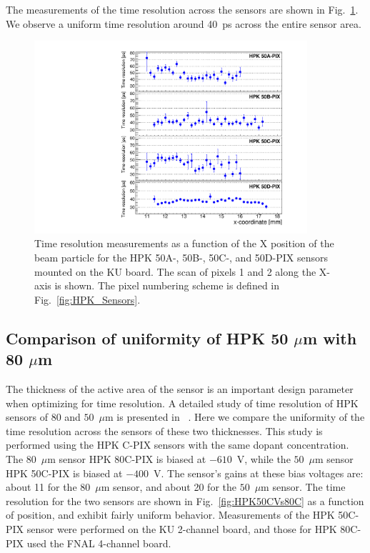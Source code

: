 \documentclass[preprint,1p]{elsarticle}
\begin{document}
The measurements of the time resolution across the sensors are shown in
Fig.~\ref{fig:KUBoard_50ABCD_TimeResolution}. We observe a uniform time
resolution around 40~ps across the entire sensor area. 


\begin{figure}[htbp] 
\centering
\includegraphics[width=0.9\textwidth]{figs/KUBoard_HPK50ABCD/KUBoard_50ABCD_TimeResolution.pdf} 
\caption{Time resolution measurements as a function of the X position of the beam particle
for the HPK 50A-, 50B-, 50C-, and 50D-PIX sensors mounted on the KU board. The scan of 
pixels 1 and 2 along the X-axis is shown. The pixel numbering scheme is 
defined in Fig.~\ref{fig:HPK_Sensors}.} 
\label{fig:KUBoard_50ABCD_TimeResolution} 
\end{figure} 


\subsection{Comparison of uniformity of HPK 50 $\mu$m with 80 $\mu$m}
\label{sec:HPK50vs80}

The thickness of the active area of the sensor is an important design parameter
when optimizing for time resolution. A detailed study of time resolution of HPK
sensors of 80 and $50$~$\mu$m is presented in ~\cite{Galloway:2017gfx}. Here we
compare the uniformity of the time resolution across the sensors of these two
thicknesses. This study is performed using the HPK C-PIX sensors with the same
dopant concentration. The $80$~$\mu$m sensor HPK 80C-PIX is biased at $-610$~V,
while the $50$~$\mu$m sensor HPK 50C-PIX is biased at $-400$~V. The sensor's
gains at these bias voltages are: about 11 for the $80$~$\mu$m sensor, and about
20 for the $50$~$\mu$m sensor. The time resolution for the two sensors are shown
in Fig.~\ref{fig:HPK50CVs80C} as a function of position, and exhibit fairly
uniform behavior. Measurements of the HPK 50C-PIX sensor were performed on the
KU 2-channel board, and those for HPK 80C-PIX used the FNAL 4-channel board. 
\end{document}

